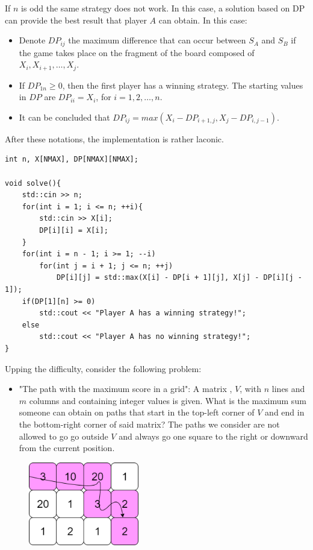 \documentclass[letterpaper]{article}
\begin{document}
If $n$ is odd the same strategy does not work. In this case, a solution based on DP can provide the best result that player $A$ can obtain. In this case:

\begin{itemize}
    \item Denote $DP_{ij}$ the maximum difference that can occur between $S_A$ and $S_B$ if the game takes place on the fragment of the board composed of $X_i, X_{i + 1}, \dots, X_j$.
    \item If $DP_{1n} \geq 0$, then the first player has a winning strategy.
    The starting values in $DP$ are $DP_{ii} = X_i$, for $i = 1,2,\dots ,n$.
    \item It can be concluded that $DP_{ij} = max(X_i - DP_{i + 1, j}, X_j - DP_{i, j - 1})$.
\end{itemize}

After these notations, the implementation is rather laconic.

\begin{lstlisting}
int n, X[NMAX], DP[NMAX][NMAX];

void solve(){
    std::cin >> n;
    for(int i = 1; i <= n; ++i){
        std::cin >> X[i];
        DP[i][i] = X[i];
    }
    for(int i = n - 1; i >= 1; --i)
        for(int j = i + 1; j <= n; ++j)
            DP[i][j] = std::max(X[i] - DP[i + 1][j], X[j] - DP[i][j - 1]);
    if(DP[1][n] >= 0)
        std::cout << "Player A has a winning strategy!";
    else
        std::cout << "Player A has no winning strategy!";
}

\end{lstlisting}

Upping the difficulty, consider the following problem:

\begin{itemize}
    \item "The path with the maximum score in a grid": A matrix , $V$, with $n$ lines and $m$ columns and containing integer values is given. What is the maximum sum someone can obtain on paths that start in the top-left corner of $V$ and end in the bottom-right corner of said matrix? The paths we consider are not allowed to go go outside $V$ and always go one square to the right or downward from the current position.
\end{itemize}

\begin{figure} [h!]
\centering
\includegraphics[width=0.43\textwidth]{pngOfDiagrams/gamesandpaths5.png}
\end{figure}
\end{document}
